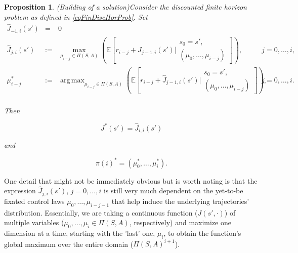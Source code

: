 \documentclass[11pt]{article} %
\newtheorem{prop}{Proposition}
\DeclareMathOperator*{\argmax}{arg\,max}
\begin{document}
\begin{prop}(Building of a solution)\label{lemBuildingFiniteSolution}
	Consider the discounted finite horizon problem as defined in \ref{eqFinDiscHorProb}. Set
\begin{equation}
	\begin{array}{rllr}
		\hat{J}_{-1,i}(s') & = & 0 \\
		\hat{J}_{j,i}(s') & := & \max_{\mu_{i-j} \in \Pi(S,A)} \left( \mathbb{E}\left[r_{i-j} + \hat{J}_{j-1,i}(s') \bigg| \begin{array}{c}
																							s_0 = s', \\
																							(\mu_0,\dots,\mu_{i-j})
																						\end{array} 
																							\right] \right), & j=0,\dots,i, \\
	
		\mu^*_{i-j} & := & \argmax_{\mu_{i-j} \in \Pi(S,A)} \left( \mathbb{E}\left[r_{i-j} + \hat{J}_{j-1,i}(s')  \bigg| \begin{array}{c}
																							s_0 = s', \\
																							(\mu_0,\dots,\mu_{i-j})
																						\end{array} 
																							\right] \right), & j=0,\dots,i. \\
	\end{array}
\end{equation}

Then

\begin{equation}
	J^*(s') = \hat{J}_{i,i}(s')
\end{equation}

and

\begin{equation}
	\pi(i)^* = (\mu^*_0,\dots,\mu^*_i).
\end{equation}

\end{prop}

One detail that might not be immediately obvious but is worth noting is that the expression $\hat{J}_{j,i}(s')$, $j=0,\dots,i$ is still very much dependent on the yet-to-be fixated control laws $\mu_0,\dots,\mu_{i-j-1}$ that help induce the underlying trajectories' distribution. Essentially, we are taking a continuous function ($J(s',\cdot)$) of multiple variables ($\mu_0,\dots,\mu_i \in \Pi(S,A)$, respectively) and maximize one dimension at a time, starting with the 'last' one, $\mu_i$, to obtain the function's global maximum over the entire domain ($\Pi(S,A)^{i+1}$).
\end{document}
